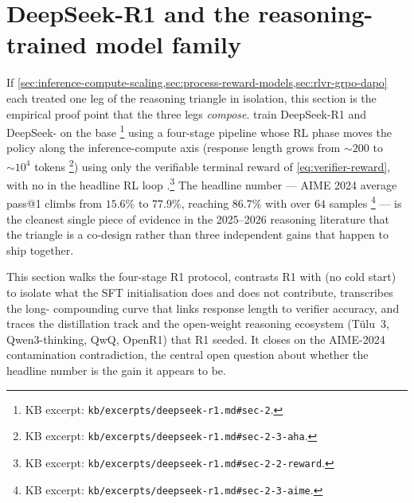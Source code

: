 
\section{DeepSeek-R1 and the reasoning-trained model family}
\label{sec:r1-family}
\label{sec:r1-protocol}

If \cref{sec:inference-compute-scaling,sec:process-reward-models,sec:rlvr-grpo-dapo}
each treated one leg of the reasoning triangle in isolation, this
section is the empirical proof point that the three legs
\emph{compose}. \citet{deepseek-r1} train DeepSeek-R1 and DeepSeek-
on the  base \citep[\S 2]{deepseek-r1}\footnote{KB excerpt:
\nolinkurl{kb/excerpts/deepseek-r1.md#sec-2}.} using a four-stage
pipeline whose RL phase moves the policy along the inference-compute
axis (response length grows from $\sim\!200$ to $\sim\!10^4$ tokens
\citep[\S 2.3]{deepseek-r1}\footnote{KB excerpt:
\nolinkurl{kb/excerpts/deepseek-r1.md#sec-2-3-aha}.}) using only the
verifiable terminal reward of \cref{eq:verifier-reward}, with no 
in the headline RL loop \citep[\S
2.2]{deepseek-r1}.\footnote{KB excerpt:
\nolinkurl{kb/excerpts/deepseek-r1.md#sec-2-2-reward}.} The headline
number --- AIME 2024 average pass@1 climbs from $15.6\%$ to $77.9\%$,
reaching $86.7\%$ with  over $64$ samples
\citep[\S 2.3]{deepseek-r1}\footnote{KB excerpt:
\nolinkurl{kb/excerpts/deepseek-r1.md#sec-2-3-aime}.} --- is the
cleanest single piece of evidence in the 2025--2026 reasoning literature
that the triangle is a co-design rather than three independent gains
that happen to ship together.

This section walks the four-stage R1 protocol, contrasts R1 with
 (no cold start) to isolate what the SFT initialisation does
and does not contribute, transcribes the long- compounding curve
that links response length to verifier accuracy, and traces the
distillation track and the open-weight reasoning ecosystem (Tülu~3,
Qwen3-thinking, QwQ, OpenR1) that R1 seeded. It closes on the
AIME-2024 contamination contradiction, the central open question
about whether the headline number is the gain it appears to be.

